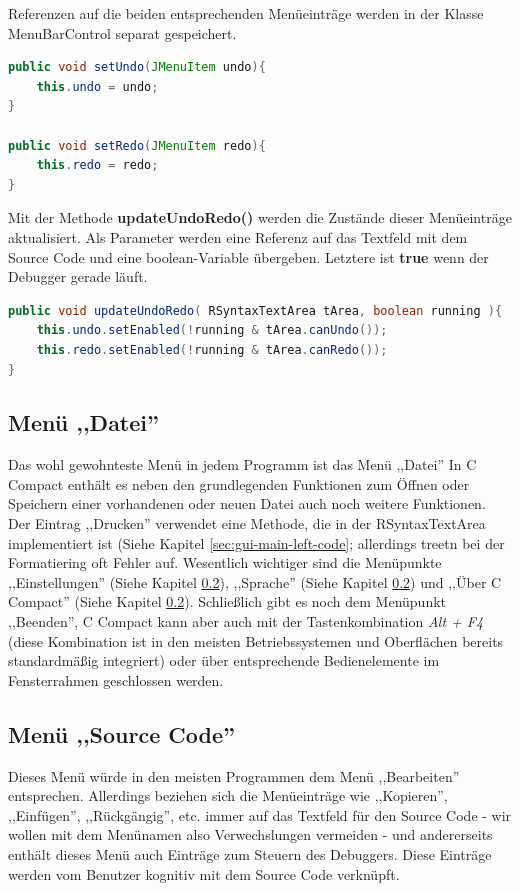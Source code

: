 Referenzen auf die beiden entsprechenden Menüeinträge werden in der Klasse MenuBarControl separat gespeichert.
\begin{lstlisting}[language=JAVA]
public void setUndo(JMenuItem undo){
	this.undo = undo;
}

public void setRedo(JMenuItem redo){
	this.redo = redo;
}
\end{lstlisting}

Mit der Methode \textbf{updateUndoRedo()} werden die Zustände dieser Menüeinträge aktualisiert. Als Parameter werden eine Referenz auf das Textfeld mit dem Source Code und eine boolean-Variable übergeben. Letztere ist \textbf{true} wenn der Debugger gerade läuft.
\begin{lstlisting}[language=JAVA]
public void updateUndoRedo( RSyntaxTextArea tArea, boolean running ){
	this.undo.setEnabled(!running & tArea.canUndo());
	this.redo.setEnabled(!running & tArea.canRedo());
}
\end{lstlisting}

\subsection{Menü ,,Datei''}
\label{sec:gui-main-menu-file}
Das wohl gewohnteste Menü in jedem Programm ist das Menü ,,Datei'' In C Compact enthält es neben den grundlegenden Funktionen zum Öffnen oder Speichern einer vorhandenen oder neuen Datei auch noch weitere Funktionen. Der Eintrag ,,Drucken'' verwendet eine Methode, die in der RSyntaxTextArea implementiert ist (Siehe Kapitel \ref{sec:gui-main-left-code}; allerdings treetn bei der Formatiering oft Fehler auf. Wesentlich wichtiger sind die Menüpunkte ,,Einstellungen'' (Siehe Kapitel \ref{}), ,,Sprache'' (Siehe Kapitel \ref{}) und ,,Über C Compact'' (Siehe Kapitel \ref{}). Schließlich gibt es noch dem Menüpunkt ,,Beenden'', C Compact kann aber auch mit der Tastenkombination \emph{Alt + F4} (diese Kombination ist in den meisten Betriebssystemen und Oberflächen bereits standardmäßig integriert) oder über entsprechende Bedienelemente im Fensterrahmen geschlossen werden.

\subsection{Menü ,,Source Code''}
Dieses Menü würde in den meisten Programmen dem Menü ,,Bearbeiten'' entsprechen. Allerdings beziehen sich die Menüeinträge wie ,,Kopieren'', ,,Einfügen'', ,,Rückgängig'', etc. immer auf das Textfeld für den Source Code - wir wollen mit dem Menünamen also Verwechslungen vermeiden - und andererseits enthält dieses Menü auch Einträge zum Steuern des Debuggers. Diese Einträge werden vom Benutzer kognitiv mit dem Source Code verknüpft.

